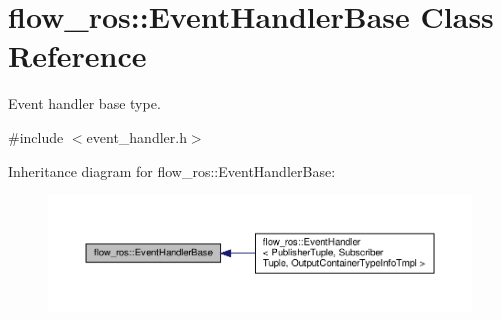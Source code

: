 \hypertarget{classflow__ros_1_1_event_handler_base}{}\section{flow\+\_\+ros\+:\+:Event\+Handler\+Base Class Reference}
\label{classflow__ros_1_1_event_handler_base}


Event handler base type.  




{\ttfamily \#include $<$event\+\_\+handler.\+h$>$}



Inheritance diagram for flow\+\_\+ros\+:\+:Event\+Handler\+Base\+:\nopagebreak
\begin{figure}[H]
\begin{center}
\leavevmode
\includegraphics[width=350pt]{classflow__ros_1_1_event_handler_base__inherit__graph}
\end{center}
\end{figure}
